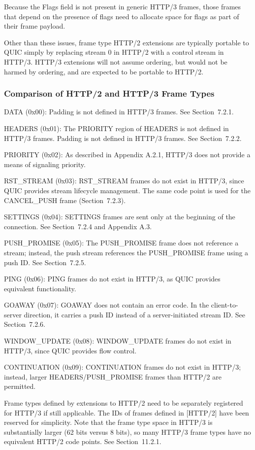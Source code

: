 \documentclass{article}
\begin{document}
Because the Flags field is not present in generic HTTP/3 frames, those frames that depend on the presence of flags need to allocate space for flags as part of their frame payload.

Other than these issues, frame type HTTP/2 extensions are typically portable to QUIC simply by replacing stream 0 in HTTP/2 with a control stream in HTTP/3.  HTTP/3 extensions will not assume ordering, but would not be harmed by ordering, and are expected to be portable to HTTP/2.

\subsubsection{Comparison of HTTP/2 and HTTP/3 Frame Types}

DATA (0x00):  Padding is not defined in HTTP/3 frames.  See Section~7.2.1.

HEADERS (0x01):  The PRIORITY region of HEADERS is not defined in HTTP/3 frames.  Padding is not defined in HTTP/3 frames.  See Section~7.2.2.

PRIORITY (0x02):  As described in Appendix A.2.1, HTTP/3 does not provide a means of signaling priority.

RST\_STREAM (0x03):  RST\_STREAM frames do not exist in HTTP/3, since QUIC provides stream lifecycle management.  The same code point is used for the CANCEL\_PUSH frame (Section~7.2.3).

SETTINGS (0x04):  SETTINGS frames are sent only at the beginning of the connection.  See Section~7.2.4 and Appendix A.3.

PUSH\_PROMISE (0x05):  The PUSH\_PROMISE frame does not reference a stream; instead, the push stream references the PUSH\_PROMISE frame using a push ID.  See Section~7.2.5.

PING (0x06):  PING frames do not exist in HTTP/3, as QUIC provides equivalent functionality.

GOAWAY (0x07):  GOAWAY does not contain an error code.  In the client-to-server direction, it carries a push ID instead of a server-initiated stream ID.  See Section~7.2.6.

WINDOW\_UPDATE (0x08):  WINDOW\_UPDATE frames do not exist in HTTP/3, since QUIC provides flow control.

CONTINUATION (0x09):  CONTINUATION frames do not exist in HTTP/3; instead, larger HEADERS/PUSH\_PROMISE frames than HTTP/2 are permitted.

Frame types defined by extensions to HTTP/2 need to be separately registered for HTTP/3 if still applicable.  The IDs of frames defined in [HTTP/2] have been reserved for simplicity.  Note that the frame type space in HTTP/3 is substantially larger (62 bits versus 8 bits), so many HTTP/3 frame types have no equivalent HTTP/2 code points. See Section~11.2.1.
\end{document}
